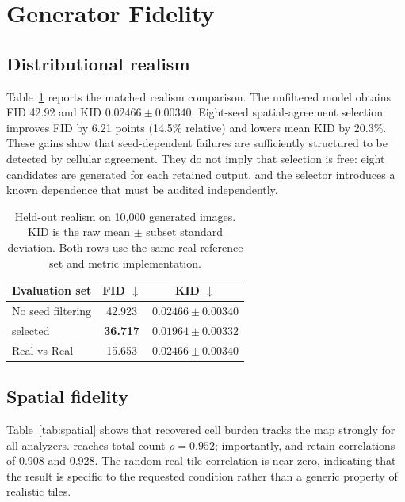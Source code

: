 \section{Generator Fidelity}
\label{sec:results}

\subsection{Distributional realism}

Table~\ref{tab:realism} reports the matched realism comparison. The unfiltered model obtains FID 42.92 and KID $0.02466\pm0.00340$. Eight-seed spatial-agreement selection improves FID by 6.21 points (14.5\% relative) and lowers mean KID by 20.3\%. These gains show that seed-dependent failures are sufficiently structured to be detected by cellular agreement. They do not imply that selection is free: eight candidates are generated for each retained output, and the selector introduces a known \cellvit{} dependence that must be audited independently.

\begin{table}
\centering
\caption{Held-out realism on 10,000 generated images. KID is the raw mean $\pm$ subset standard deviation. Both rows use the same real reference set and metric implementation.}
\label{tab:realism}
\setlength{\tabcolsep}{2.5pt}
\begin{tabular}{lcc}
\toprule
Evaluation set & FID $\downarrow$ & KID $\downarrow$ \\
\midrule
No seed filtering & 42.923 & $0.02466\!\pm\!0.00340$ \\
\cellvit{} selected & \textbf{36.717} & $\mathbf{0.01964\!\pm\!0.00332}$ \\
Real vs Real & 15.653 & $0.02466\!\pm\!0.00340$ \\ %
\bottomrule
\end{tabular}
\end{table}

\subsection{Spatial fidelity}

Table~\ref{tab:spatial} shows that recovered cell burden tracks the map strongly for all analyzers. \cellvit{} reaches total-count $\rho=0.952$; importantly, \hovernet{} and \stardist{} retain correlations of 0.908 and 0.928. The random-real-tile correlation is near zero, indicating that the result is specific to the requested condition rather than a generic property of realistic tiles.

